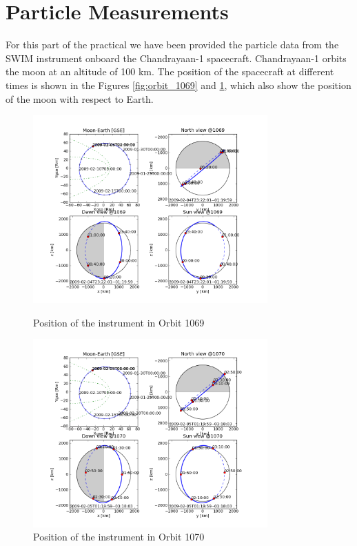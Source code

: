 \documentclass{article}
\begin{document}
\section{Particle Measurements}

For this part of the practical we have been provided the particle data from the SWIM
instrument onboard the Chandrayaan-1 spacecraft. Chandrayaan-1 orbits the moon at an altitude of 100 km. The position of the spacecraft at different times is shown in the Figures \ref{fig:orbit_1069} and \ref{fig:orbit_1070}, which also show the position of the moon with respect to Earth.

\begin{figure}[ht]
\begin{minipage}[c]{0.5\linewidth}
\centering
\includegraphics[width=9cm]{Figures/orbit_1069.png}
\caption{Position of the instrument in Orbit 1069}
\label{fig:orbit_1069}
\end{minipage}
\hspace{0.2cm}
\begin{minipage}[c]{0.5\linewidth}
\centering
\includegraphics[width=9cm]{Figures/orbit_1070.png}
\caption{Position of the instrument in Orbit 1070}
\label{fig:orbit_1070}
\end{minipage}
\end{figure}
\end{document}
